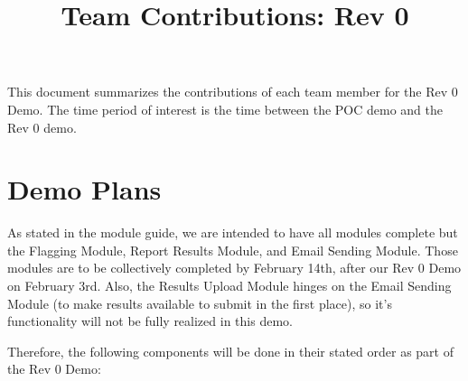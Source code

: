\documentclass{article}
\title{Team Contributions: Rev 0\\\progname}
\author{\authname}
\date{}
\begin{document}
\maketitle

This document summarizes the contributions of each team member for the Rev 0
Demo.  The time period of interest is the time between the POC demo and the Rev
0 demo.

\section{Demo Plans}


As stated in the module guide, we are intended to have all modules complete but
the Flagging Module, Report Results Module, and Email Sending Module. Those modules
are to be collectively completed by February 14th, after our Rev 0 Demo on February 3rd. 
Also, the Results Upload Module hinges on the Email Sending Module (to make results available to 
submit in the first place), so it's functionality will not be fully realized in this
demo.

Therefore, the following components will be done in their stated order as part of the Rev 0 Demo:
\end{document}

